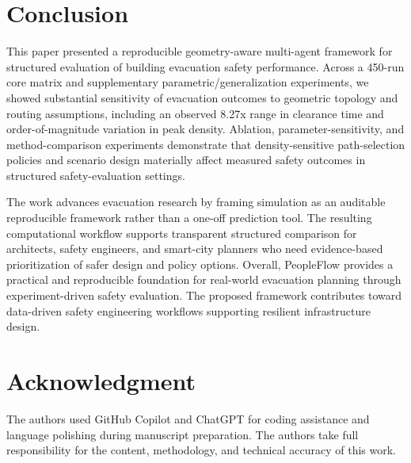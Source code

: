 \documentclass[journal]{IEEEtran}
\begin{document}
\section{Conclusion}
This paper presented a reproducible geometry-aware multi-agent framework for structured evaluation of building evacuation safety performance. Across a 450-run core matrix and supplementary parametric/generalization experiments, we showed substantial sensitivity of evacuation outcomes to geometric topology and routing assumptions, including an observed 8.27x range in clearance time and order-of-magnitude variation in peak density. Ablation, parameter-sensitivity, and method-comparison experiments demonstrate that density-sensitive path-selection policies and scenario design materially affect measured safety outcomes in structured safety-evaluation settings.

The work advances evacuation research by framing simulation as an auditable reproducible framework rather than a one-off prediction tool. The resulting computational workflow supports transparent structured comparison for architects, safety engineers, and smart-city planners who need evidence-based prioritization of safer design and policy options. Overall, PeopleFlow provides a practical and reproducible foundation for real-world evacuation planning through experiment-driven safety evaluation.
The proposed framework contributes toward data-driven safety engineering workflows supporting resilient infrastructure design.

\section*{Acknowledgment}
The authors used GitHub Copilot and ChatGPT for coding assistance and language polishing during manuscript preparation. The authors take full responsibility for the content, methodology, and technical accuracy of this work.

\FloatBarrier


\end{document}
